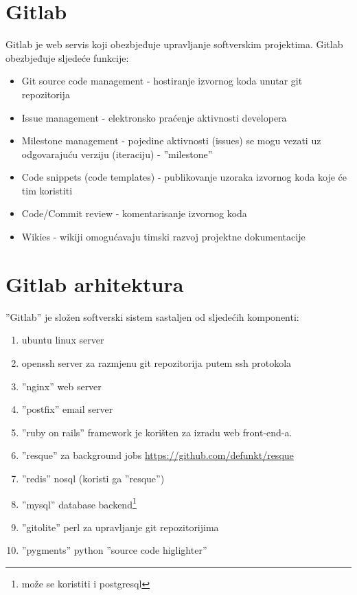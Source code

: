 \documentclass[times, utf8, seminar]{fit}
\begin{document}
\section{Gitlab}
Gitlab je web servis koji obezbjeđuje upravljanje softverskim projektima. Gitlab obezbjeđuje sljedeće funkcije:
\begin{itemize}
  \item Git source code management - hostiranje izvornog koda unutar git repozitorija
  \item Issue management - elektronsko praćenje aktivnosti developera
  \item Milestone management - pojedine aktivnosti (issues) se mogu vezati uz odgovarajuću verziju (iteraciju) - ''milestone''
  \item Code snippets (code templates) - publikovanje uzoraka izvornog koda koje će tim koristiti
  \item Code/Commit review - komentarisanje izvornog koda
  \item Wikies - wikiji omogućavaju timski razvoj projektne dokumentacije
\end{itemize}

\section{Gitlab arhitektura}
''Gitlab'' je složen softverski sistem sastaljen od sljedećih komponenti:
\begin{enumerate}
  \item ubuntu linux server
  \item openssh server za razmjenu git repozitorija putem ssh protokola 
  \item ''nginx'' web server
  \item ''postfix'' email server
  \item ''ruby on rails'' framework je korišten za izradu web front-end-a.
  \item ''resque'' za background jobs \url{https://github.com/defunkt/resque}
  \item ''redis'' nosql (koristi ga ''resque'')
  \item ''mysql'' database backend\footnote{može se koristiti i postgresql}
  \item ''gitolite'' perl za upravljanje git repozitorijima
  \item ''pygments'' python ''source code higlighter''
\end{enumerate}
\end{document}
